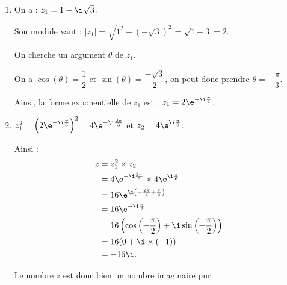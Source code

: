 \begin{enumerate}
\item  On a : $z_1=1-\i\sqrt{3}$.

Son module vaut : $|z_1|=\sqrt{1^2+\left(-\sqrt{3}\right)^2}=\sqrt{1+3}=2$.

On cherche un argument $\theta$ de $z_1$.

On a $\cos(\theta)=\dfrac{1}{2}$ et $\sin(\theta)=\dfrac{-\sqrt{3}}{2}$, on peut donc prendre $\theta=-\dfrac{\pi}{3}$.

Ainsi, la forme exponentielle de $z_1$ est : $z_1=2\e^{-\i\frac{\pi}{3}}$.

\item $z_1^2=\left(2\e^{-\i\frac{\pi}{3}}\right)^2=4\e^{-\i\frac{2\pi}{3}}$ et $z_2=4\e^{\i\frac{\pi}{6}}$.

Ainsi :
\begin{align*}
z &= z_1^2\times z_2 \\
&= 4\e^{-\i\frac{2\pi}{3}}\times 4\e^{\i\frac{\pi}{6}} \\
&= 16\e^{\i\left(-\frac{2\pi}{3}+\frac{\pi}{6}\right)} \\
&= 16\e^{-\i\frac{\pi}{2}} \\
&= 16\left(\cos\left(-\frac{\pi}{2}\right)+\i\sin\left(-\frac{\pi}{2}\right)\right) \\
&= 16(0+\i\times(-1)) \\
&= -16\i.
\end{align*}

Le nombre $z$ est donc bien un nombre imaginaire pur.
\end{enumerate}

\bigskip
